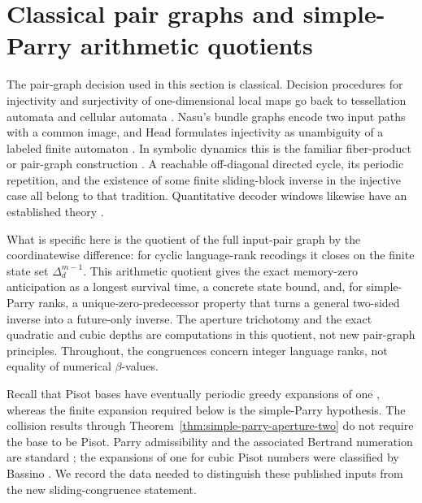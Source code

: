 \section{Classical pair graphs and simple-Parry arithmetic quotients}
\label{sec:simple-parry-causal-obstructions}

The pair-graph decision used in this section is classical.  Decision
procedures for injectivity and surjectivity of one-dimensional local maps go
back to tessellation automata and cellular automata
\cite{AmorosoPatt1972,Richardson1972}.  Nasu's bundle graphs encode two input
paths with a common image, and Head formulates injectivity as unambiguity of a
labeled finite automaton \cite{Nasu1977,Head1989}.  In symbolic dynamics this
is the familiar fiber-product or pair-graph construction
\cite{LindMarcus1995,Nasu1995}.  A reachable off-diagonal directed cycle,
its periodic repetition, and the existence of some finite sliding-block
inverse in the injective case all belong to that tradition.  Quantitative
decoder windows likewise have an established theory
\cite{Ashley1988,Ashley1991,Ashley1996}.

What is specific here is the quotient of the full input-pair graph by the
coordinatewise difference: for cyclic language-rank recodings it closes on
the finite state set $\Delta_d^{m-1}$.  This arithmetic quotient gives the
exact memory-zero anticipation as a longest survival time, a concrete state
bound, and, for simple-Parry ranks, a unique-zero-predecessor property that
turns a general two-sided inverse into a future-only inverse.  The aperture
trichotomy and the exact quadratic and cubic depths are computations in this
quotient, not new pair-graph principles.  Throughout, the congruences concern
integer language ranks, not equality of numerical $\beta$-values.

Recall that Pisot bases have eventually periodic greedy expansions of one
\cite{Schmidt1980}, whereas the finite expansion required below is the
simple-Parry hypothesis.  The collision results through
Theorem~\ref{thm:simple-parry-aperture-two} do not require the base to be
Pisot.  Parry admissibility and the associated Bertrand numeration are standard
\cite{Parry1960,CharlierCisterninoStipulanti2022}; the expansions of one for
cubic Pisot numbers were classified by Bassino \cite{Bassino2002}.  We record
the data needed
to distinguish these published inputs from the new sliding-congruence
statement.

